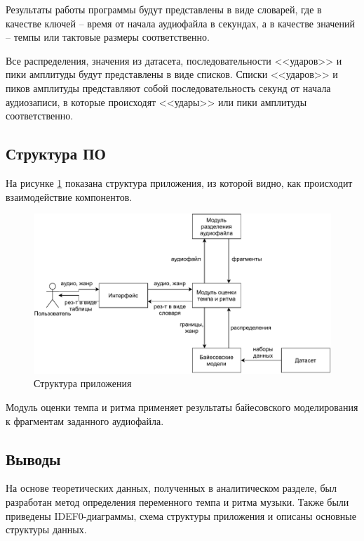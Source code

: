 Результаты работы программы будут представлены в виде словарей, где в качестве ключей -- время от начала аудиофайла в секундах, а в качестве значений -- темпы или тактовые размеры соответственно.

Все распределения, значения из датасета, последовательности <<ударов>> и пики амплитуды будут представлены в виде списков. Списки <<ударов>> и пиков амплитуды представляют собой последовательность секунд от начала аудиозаписи, в которые происходят <<удары>> или пики амплитуды соответственно.

\subsection{Структура ПО}

На рисунке \ref{img:sw_structure} показана структура приложения, из которой видно, как происходит взаимодействие компонентов.

\begin{figure}[h]
	\centering
	\includegraphics[scale=0.9]{svg/sw_structure.pdf}
	\caption{Структура приложения}
	\label{img:sw_structure}
\end{figure}

Модуль оценки темпа и ритма применяет результаты байесовского моделирования к фрагментам заданного аудиофайла.

\newpage

\subsection*{Выводы}

На основе теоретических данных, полученных в аналитическом разделе, был разработан метод определения переменного темпа и ритма музыки. Также были приведены IDEF0-диаграммы, схема структуры приложения и описаны основные структуры данных.


